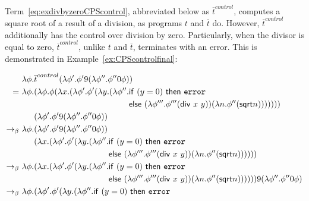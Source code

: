 %
Term~\eqref{eq:exdivbyzeroCPScontrol}, abbreviated below as $\overline{t}^{control}$, computes a square root of a result of a division, as programs $t$ and $\overline{t}$ do. However,  $\overline{t}^{control}$ additionally has the control over division by zero. Particularly, when the divisor is equal to zero, $\overline{t}^{control}$, unlike $t$ and $\overline{t}$, terminates with an error. This is demonstrated in Example~\ref{ex:CPScontrolfinal}:
%
\begin{example} \label{ex:CPScontrolfinal}
\begin{align}
& \lambda \phi. \overline{t}^{control} (\lambda \phi'. \phi' 9 (\lambda \phi''. \phi'' 0 \phi)) \notag \\
= \ & \lambda \phi. (\lambda \phi. \phi ( \lambda x. ( \lambda \phi'. \phi' ( \lambda y. ( \lambda \phi''.    \mathsf{if} \ (y = 0)  \ \mathsf{then} \ \mathtt{error}  \notag \\
& \phantom{\lambda \phi. (\lambda \phi. \phi ( \lambda x. ( \lambda \phi'. \phi' ( \lambda y. ( \lambda \phi''.} 
 \mathsf{else}  \  (\lambda \phi'''. \phi''' (\mathsf{div} \ x \ y) )  (\lambda n.  \phi''(  \mathsf{sqrt}  n)) ) )))) \notag \\
 & \phantom{\lambda \phi.} (\lambda \phi'. \phi' 9 (\lambda \phi''. \phi'' 0 \phi)) \notag \\
 \bconv \ & \lambda \phi.  (\lambda \phi'. \phi' 9 (\lambda \phi''. \phi'' 0 \phi)) \notag \\
 & \phantom{\lambda \phi.} ( \lambda x. ( \lambda \phi'. \phi' ( \lambda y. ( \lambda \phi''.    \mathsf{if} \ (y = 0)  \ \mathsf{then} \ \mathtt{error} \notag \\
& \phantom{\lambda \phi.  ( \lambda x. ( \lambda \phi'. \phi' ( \lambda y. ( \lambda \phi''.    } 
 \mathsf{else}  \  (\lambda \phi'''. \phi''' (\mathsf{div} \ x \ y) )  (\lambda n.  \phi''(  \mathsf{sqrt}  n)) ) ))) \notag \\
 \bconv \ & \lambda \phi.   ( \lambda x. ( \lambda \phi'. \phi' ( \lambda y. ( \lambda \phi''.    \mathsf{if} \ (y = 0)  \ \mathsf{then} \ \mathtt{error} \notag \\
 & \phantom{\lambda \phi.   ( \lambda x. ( \lambda \phi'. \phi' ( \lambda y. ( \lambda \phi''.   }
  \mathsf{else}  \  (\lambda \phi'''. \phi''' (\mathsf{div} \ x \ y) )  (\lambda n.  \phi''(  \mathsf{sqrt}  n)) ) ))) 9 (\lambda \phi''. \phi'' 0 \phi) \notag \\
 \bconv \ & \lambda \phi.   ( \lambda \phi'. \phi' ( \lambda y. ( \lambda \phi''.    \mathsf{if} \ (y = 0)  \ \mathsf{then} \ \mathtt{error} \notag \\

\end{align}
\end{example}
